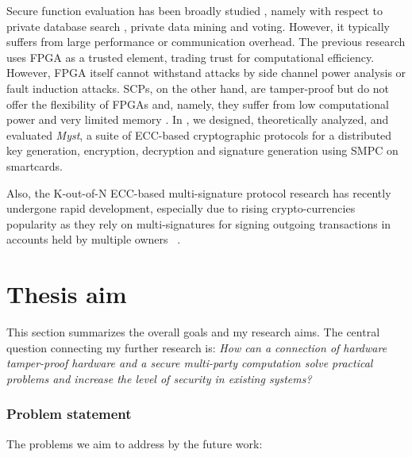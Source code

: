 \documentclass[
  digital, %
  twoside, %
  table,   %
  lof,     %
  lot,     %
]{fithesis3}
\theoremstyle{definition}
\theoremstyle{remark}
\begin{document}
\begin{ecmmnt}
Secure function evaluation has been broadly studied \cite{
yao82, conf/sp/SonghoriHS0K15, Malkhi:2004:FST:1251375.1251395, 10.1007/978-3-642-40041-4_5}, namely with respect to private database search \cite{Bertino2005, Naor:1999:PPA:336992.337028}, private data mining \cite{Aldeen2015} and voting. However, it typically suffers from large performance or communication overhead.
The previous research uses FPGA as a trusted element, trading trust for computational efficiency. However, FPGA itself cannot withstand attacks by side channel power analysis or fault induction attacks.
SCPs, on the other hand, are tamper-proof but do not offer the flexibility of FPGAs and, namely, they suffer from low computational power and very limited memory \cite{10.1007/978-3-642-19074-2_1, Boureanu:2015:LCC:2714576.2714591, cryptoeprint:2016:615}.
In \cite{2017-ccs-mavroudis}, we designed, theoretically analyzed, and evaluated \emph{Myst}, a suite of ECC-based cryptographic protocols for a distributed key generation, encryption, decryption and signature generation using SMPC on smartcards.

Also, the K-out-of-N ECC-based multi-signature protocol research has recently undergone rapid development, especially due to rising crypto-currencies popularity as they rely on multi-signatures for signing outgoing transactions in accounts held by multiple owners ~\cite{Bellare:2007:UAS:2394539.2394589, Bnz2017BulletproofsSP, cryptoeprint:2018:068}. 
\end{ecmmnt}



\chapter{Thesis aim}\label{sec:aim}
This section summarizes the overall goals and my research aims.
The central question connecting my further research is: \emph{How can a connection of hardware tamper-proof hardware and a secure multi-party computation solve practical problems and increase the level of security in existing systems?}

\subsection{Problem statement}
The problems we aim to address by the future work:
\end{document}
